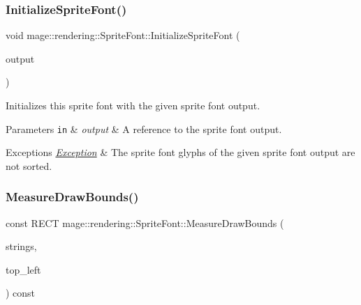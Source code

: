 \subsubsection{\texorpdfstring{Initialize\+Sprite\+Font()}{InitializeSpriteFont()}}
{\footnotesize\ttfamily void mage\+::rendering\+::\+Sprite\+Font\+::\+Initialize\+Sprite\+Font (\begin{DoxyParamCaption}\item[{const \hyperlink{structmage_1_1rendering_1_1_sprite_font_output}{Sprite\+Font\+Output} \&}]{output }\end{DoxyParamCaption})\hspace{0.3cm}{\ttfamily [private]}}

Initializes this sprite font with the given sprite font output.


\begin{DoxyParams}[1]{Parameters}
\mbox{\tt in}  & {\em output} & A reference to the sprite font output. \\
\hline
\end{DoxyParams}

\begin{DoxyExceptions}{Exceptions}
{\em \hyperlink{classmage_1_1_exception}{Exception}} & The sprite font glyphs of the given sprite font output are not sorted. \\
\hline
\end{DoxyExceptions}
\hypertarget{classmage_1_1rendering_1_1_sprite_font_a661820d3d7b20a797966007cd712a76b}{}\label{classmage_1_1rendering_1_1_sprite_font_a661820d3d7b20a797966007cd712a76b} 
\subsubsection{\texorpdfstring{Measure\+Draw\+Bounds()}{MeasureDrawBounds()}}
{\footnotesize\ttfamily const R\+E\+CT mage\+::rendering\+::\+Sprite\+Font\+::\+Measure\+Draw\+Bounds (\begin{DoxyParamCaption}\item[{gsl\+::span$<$ const \hyperlink{classmage_1_1rendering_1_1_color_string}{Color\+String} $>$}]{strings,  }\item[{const \hyperlink{namespacemage_aa87237ad091f5cd7da612b8523fc108f}{F32x2} \&}]{top\+\_\+left }\end{DoxyParamCaption}) const}

